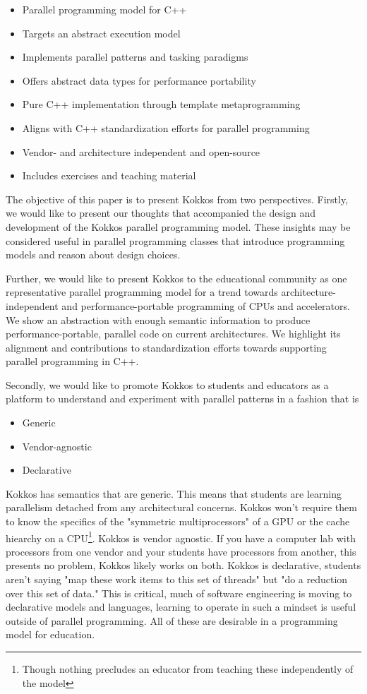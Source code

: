 \begin{itemize}
\item Parallel programming model for C++
\item Targets an abstract execution model
\item Implements parallel patterns and tasking paradigms
\item Offers abstract data types for performance portability
\item Pure C++ implementation through template metaprogramming
\item Aligns with C++ standardization efforts for parallel programming
\item Vendor- and architecture independent and open-source
\item Includes exercises and teaching material
\end{itemize}

The objective of this paper is to present Kokkos from two perspectives. Firstly, we would like to present our thoughts that accompanied the design and development of the Kokkos parallel programming model. These insights may be considered useful in parallel programming classes that introduce programming models and reason about design choices.

Further, we would like to present Kokkos to the educational community as one representative parallel programming model for a trend towards architecture-independent and performance-portable programming of CPUs and accelerators. We show an abstraction with enough semantic information to produce performance-portable, parallel code on current architectures. We highlight its alignment and contributions to standardization efforts towards supporting parallel programming in C++. 

Secondly, we would like to promote Kokkos to students and educators as a platform to understand and experiment with parallel patterns in a fashion that is

\begin{itemize}
\item Generic
\item Vendor-agnostic
\item Declarative
\end{itemize}

Kokkos has semantics that are generic. This means that students are learning parallelism detached from any architectural concerns. Kokkos won't require them to know the specifics of the "symmetric multiprocessors" of a GPU or the cache hiearchy on a CPU\footnote{Though nothing precludes an educator from teaching these independently of the model}. Kokkos is vendor agnostic. If you have a computer lab with processors from one vendor and your students have processors from another, this presents no problem, Kokkos likely works on both. Kokkos is declarative, students aren't saying "map these work items to this set of threads" but "do a reduction over this set of data." This is critical, much of software engineering is moving to declarative models and languages, learning to operate in such a mindset is useful outside of parallel programming. All of these are desirable in a programming model for education.

